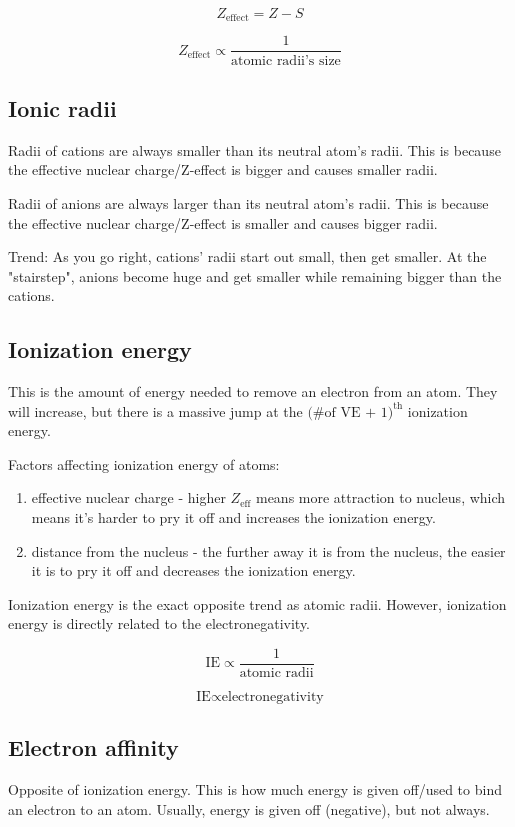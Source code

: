 \documentclass[letterpaper, 12pt]{article}
\begin{document}
	$$Z_{\text{effect}} = Z - S$$
	
	$$Z_{\text{effect}} \propto \frac{1}{\text{atomic radii's size}}$$
	
	\subsection{Ionic radii}
	Radii of cations are always smaller than its neutral atom's radii. This is because the effective nuclear charge/Z-effect is bigger and causes smaller radii.
	
	Radii of anions are always larger than its neutral atom's radii. This is because the effective nuclear charge/Z-effect is smaller and causes bigger radii.
	
	Trend: As you go right, cations' radii start out small, then get smaller. At the "stairstep", anions become huge and get smaller while remaining bigger than the cations.
	
	\subsection{Ionization energy}
	This is the amount of energy needed to remove an electron from an atom. They will increase, but there is a massive jump at the $\text{(\# of VE + 1)}^{\text{th}}$ ionization energy.
	
	Factors affecting ionization energy of atoms:
	\begin{enumerate}
		\item effective nuclear charge - higher $Z_{\text{eff}}$ means more attraction to nucleus, which means it's harder to pry it off and increases the ionization energy.
		\item distance from the nucleus - the further away it is from the nucleus, the easier it is to pry it off and decreases the ionization energy.
	\end{enumerate}
	
	Ionization energy is the exact opposite trend as atomic radii. However, ionization energy is directly related to the electronegativity.
	
	$$\text{IE} \propto \frac{1}{\text{atomic radii}}$$
	
	$$\text{IE} \propto \text{electronegativity}$$
	
	\subsection{Electron affinity}
	Opposite of ionization energy. This is how much energy is given off/used to bind an electron to an atom. Usually, energy is given off (negative), but not always.
\end{document}
